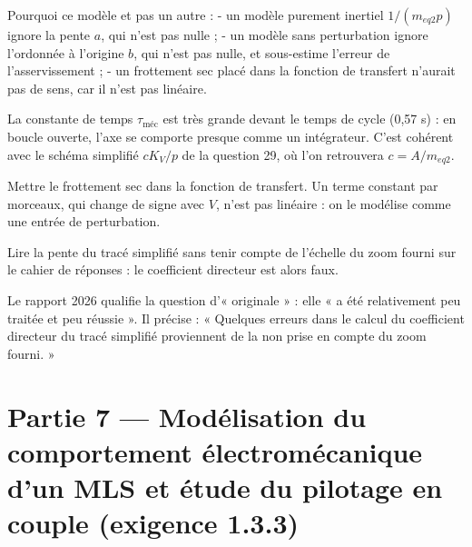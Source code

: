 \documentclass[11pt,a4paper]{article}
\newcommand{\equationajustee}[1]{%
  \sbox{\boiteequation}{$\displaystyle #1$}%
  \ifdim\wd\boiteequation>\linewidth
    \[\resizebox{\linewidth}{!}{\usebox{\boiteequation}}\]%
  \else
    \[#1\]%
  \fi}
\begin{document}
\equationajustee{b = 1{,}1\ \text{N}}

Pourquoi ce modèle et pas un autre :
- un modèle purement inertiel \(1/(m_{eq2}p)\) ignore la pente \(a\), qui n'est pas nulle ;
- un modèle sans perturbation ignore l'ordonnée à l'origine \(b\), qui n'est pas nulle, et sous-estime l'erreur de l'asservissement ;
- un frottement sec placé dans la fonction de transfert n'aurait pas de sens, car il n'est pas linéaire.

La constante de temps \(\tau_{\text{méc}}\) est très grande devant le temps de cycle (0,57 s) : en boucle ouverte, l'axe se comporte presque comme un intégrateur. C'est cohérent avec le schéma simplifié \(cK_V/p\) de la question 29, où l'on retrouvera \(c = A/m_{eq2}\).

\begin{piege}

Mettre le frottement sec dans la fonction de transfert. Un terme constant par morceaux, qui change de signe avec \(V\), n'est pas linéaire : on le modélise comme une entrée de perturbation.

\end{piege}

\begin{piege}

Lire la pente du tracé simplifié sans tenir compte de l'échelle du zoom fourni sur le cahier de réponses : le coefficient directeur est alors faux.

\end{piege}

\begin{jury}

Le rapport 2026 qualifie la question d'« originale » : elle « a été relativement peu traitée et peu réussie ». Il précise : « Quelques erreurs dans le calcul du coefficient directeur du tracé simplifié proviennent de la non prise en compte du zoom fourni. »

\end{jury}

\hypertarget{partie-7-moduxe9lisation-du-comportement-uxe9lectromuxe9canique-dun-mls-et-uxe9tude-du-pilotage-en-couple-exigence-1.3.3}{%
\section{Partie 7 --- Modélisation du comportement électromécanique d'un MLS et étude du pilotage en couple (exigence 1.3.3)}\label{partie-7-moduxe9lisation-du-comportement-uxe9lectromuxe9canique-dun-mls-et-uxe9tude-du-pilotage-en-couple-exigence-1.3.3}}
\end{document}
